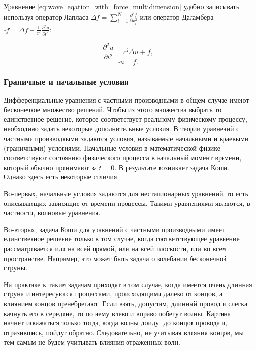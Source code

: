\documentclass[12pt,a4paper,russian]{report}
\begin{document}
	Уравнение \eqref{eq:wave_eqation_with_force_multidimension} удобно записывать используя оператор Лапласа $ \displaystyle \Delta f = \sum_{i=1}^{N} \frac{\partial^2 f}{\partial x_i^2} $ или оператор Даламбера $ \displaystyle \square f = \Delta f - \frac{1}{c^2} \frac{\partial^2 u}{\partial t^2}$:
	
	\begin{equation*}
		\frac{\partial^2 u}{\partial t^2} = c^2 \Delta u + f ,
	\end{equation*}
	\begin{equation*}
		\square u = f.
	\end{equation*}
		
	
	\subsubsection{Граничные и начальные условия}
	
	
	Дифференциальные уравнения с частными производными в общем случае имеют бесконечное множество решений. Чтобы из этого множества выбрать то единственное решение, которое соответствует реальному физическому процессу, необходимо задать некоторые дополнительные условия. В теории уравнений с частными производными задаются условия, называемые начальными и краевыми (граничными) условиями. Начальные условия в математической физике соответствуют состоянию физического процесса в начальный момент времени, который обычно принимают за $t=0$. В результате возникает задача Коши. Однако здесь есть некоторые отличия. 
	
	Во-первых, начальные условия задаются для нестационарных уравнений, то есть описывающих зависящие от времени процессы. Такими уравнениями являются, в частности, волновые уравнения. 
	
	Во-вторых, задача Коши для уравнений с частными производными имеет единственное решение только в том случае, когда соответствующее уравнение рассматривается или на всей прямой, или на всей плоскости, или во всем пространстве. Например, это может быть задача о колебании бесконечной струны. 
	
	На практике к таким задачам приходят в том случае, когда имеется очень длинная струна и интересуются процессами, происходящими далеко от концов, а влиянием концов пренебрегают. Если взять, допустим, длинный провод и слегка качнуть его в середине, то по нему влево и вправо побегут волны. Картина начнет искажаться только тогда, когда волны дойдут до концов провода и, отразившись, пойдут обратно. Следовательно, не учитывая влияния концов, мы тем самым не будем учитывать влияния отраженных волн.
	
\end{document}
